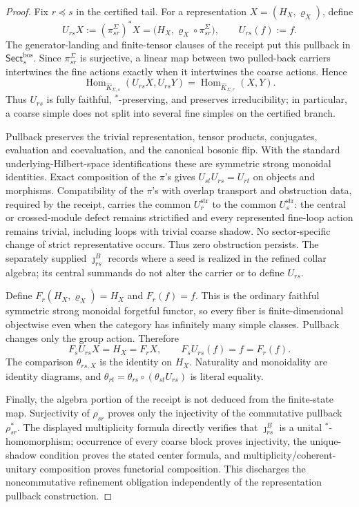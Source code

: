 \documentclass[11pt]{article}
\begin{document}
\begin{proof}
Fix \(r\preceq s\) in the certified tail. For a representation
\(X=(H_X,\varrho_X)\), define
\[
U_{rs}X
:=(\pi_{sr}^{\Sigma})^*X
=\bigl(H_X,\varrho_X\circ\pi_{sr}^{\Sigma}\bigr),
\qquad
U_{rs}(f):=f.
\]
The generator-landing and finite-tensor clauses of the receipt put this pullback in
\(\mathsf{Sect}^{\mathrm{bos}}_s\). Since \(\pi_{sr}^{\Sigma}\) is surjective, a linear map
between two pulled-back carriers intertwines the fine actions exactly when it intertwines the
coarse actions. Hence
\[
\operatorname{Hom}_{\widehat K_{\Sigma,s}}(U_{rs}X,U_{rs}Y)
=
\operatorname{Hom}_{\widehat K_{\Sigma,r}}(X,Y).
\]
Thus \(U_{rs}\) is fully faithful, \(^*\)-preserving, and preserves irreducibility; in particular,
a coarse simple does not split into several fine simples on the certified branch.

Pullback preserves the trivial representation, tensor products, conjugates, evaluation and
coevaluation, and the canonical bosonic flip. With the standard underlying-Hilbert-space
identifications these are symmetric strong monoidal identities. Exact composition of the
\(\pi\)'s gives \(U_{st}U_{rs}=U_{rt}\) on objects and morphisms. Compatibility of the \(\pi\)'s
with overlap transport and obstruction data, required by the receipt, carries the common
\(U^{\mathrm{str}}_r\) to the common \(U^{\mathrm{str}}_s\): the central or crossed-module defect
remains strictified and every represented fine-loop action remains trivial, including loops with
trivial coarse shadow. No sector-specific change of strict representative occurs.
Thus zero obstruction persists. The separately supplied \(\jmath_{rs}^{B}\) records
where a seed is realized in the refined collar algebra; its central summands do not alter
the carrier or to define \(U_{rs}\).

Define \(F_r(H_X,\varrho_X)=H_X\) and \(F_r(f)=f\). This is the ordinary faithful symmetric
strong monoidal forgetful functor, so every fiber is finite-dimensional objectwise even when the
category has infinitely many simple classes. Pullback changes only the group action. Therefore
\[
F_sU_{rs}X=H_X=F_rX,
\qquad
F_sU_{rs}(f)=f=F_r(f).
\]
The comparison \(\theta_{rs,X}\) is the identity on \(H_X\). Naturality and monoidality are
identity diagrams, and
\(\theta_{rt}=\theta_{rs}\circ(\theta_{st}U_{rs})\) is literal equality.

Finally, the algebra portion of the receipt is not deduced from the finite-state map. Surjectivity
of \(\rho_{sr}\) proves only the injectivity of the commutative pullback \(\rho_{sr}^*\). The
displayed multiplicity formula directly verifies that \(\jmath_{rs}^{B}\) is a unital
\(^*\)-homomorphism; occurrence of every coarse block proves injectivity, the unique-shadow
condition proves the stated center formula, and multiplicity/coherent-unitary composition proves
functorial composition. This discharges the noncommutative refinement obligation independently of
the representation pullback construction.
\end{proof}
\end{document}
